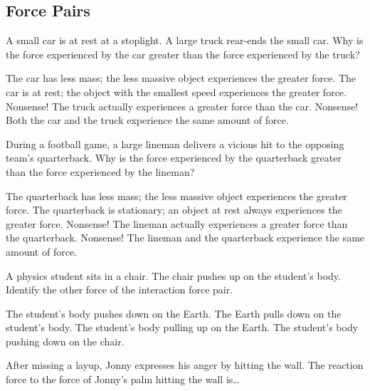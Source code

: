 \documentclass[../main-physics-problems.tex]{subfiles}
\begin{document}
\begin{questions}
\begin{EnvUplevel}
    \subsection{Force Pairs}
\end{EnvUplevel}

\question
A small car is at rest at a stoplight. A large truck rear-ends the small car. Why is the force experienced by the car greater than the force experienced by the truck?

\begin{randomizechoices}
    \choice The car has less mass; the less massive object experiences the greater force.
    \choice The car is at rest; the object with the smallest speed experiences the greater force.
    \choice Nonsense! The truck actually experiences a greater force than the car.
    \correctchoice Nonsense! Both the car and the truck experience the same amount of force.    
\end{randomizechoices}

\question
During a football game, a large lineman delivers a vicious hit to the opposing team’s quarterback. Why is the force experienced by the quarterback greater than the force experienced by the lineman?

\begin{randomizechoices}
    \choice The quarterback has less mass; the less massive object experiences the greater force.
    \choice The quarterback is stationary; an object at rest always experiences the greater force.
    \choice Nonsense! The lineman actually experiences a greater force than the quarterback.
    \correctchoice Nonsense! The lineman and the quarterback experience the same amount of force.    
\end{randomizechoices}

\question
A physics student sits in a chair. The chair pushes up on the student's body. Identify the other force of the interaction force pair.

\begin{randomizechoices}
    \choice The student's body pushes down on the Earth.
    \choice The Earth pulls down on the student's body.
    \choice The student's body pulling up on the Earth.
    \correctchoice The student's body pushing down on the chair.    
\end{randomizechoices}

\question
After missing a layup, Jonny expresses his anger by hitting the wall.  The reaction force to the force of Jonny's palm hitting the wall is\dots 


\end{questions}
\end{document}

